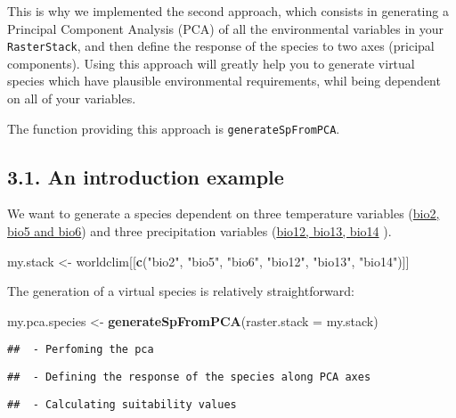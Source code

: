 \documentclass[]{article}
\newenvironment{Shaded}{\begin{snugshade}}{\end{snugshade}}
\newcommand{\KeywordTok}[1]{\textcolor[rgb]{0.13,0.29,0.53}{\textbf{#1}}}
\newcommand{\DataTypeTok}[1]{\textcolor[rgb]{0.13,0.29,0.53}{#1}}
\newcommand{\StringTok}[1]{\textcolor[rgb]{0.31,0.60,0.02}{#1}}
\newcommand{\NormalTok}[1]{#1}
\begin{document}
This is why we implemented the second approach, which consists in
generating a Principal Component Analysis (PCA) of all the environmental
variables in your \texttt{RasterStack}, and then define the response of
the species to two axes (pricipal components). Using this approach will
greatly help you to generate virtual species which have plausible
environmental requirements, whil being dependent on all of your
variables.

The function providing this approach is \texttt{generateSpFromPCA}.

\subsection{3.1. An introduction
example}\label{an-introduction-example-1}

We want to generate a species dependent on three temperature variables
(\href{http://worldclim.org/bioclim}{bio2, bio5 and bio6}) and three
precipitation variables (\href{http://worldclim.org/bioclim}{bio12,
bio13, bio14} ).

\begin{Shaded}
\begin{Highlighting}[]
\NormalTok{my.stack <-}\StringTok{ }\NormalTok{worldclim[[}\KeywordTok{c}\NormalTok{(}\StringTok{"bio2"}\NormalTok{, }\StringTok{"bio5"}\NormalTok{, }\StringTok{"bio6"}\NormalTok{, }\StringTok{"bio12"}\NormalTok{, }\StringTok{"bio13"}\NormalTok{, }\StringTok{"bio14"}\NormalTok{)]]}
\end{Highlighting}
\end{Shaded}

The generation of a virtual species is relatively straightforward:

\begin{Shaded}
\begin{Highlighting}[]
\NormalTok{my.pca.species <-}\StringTok{ }\KeywordTok{generateSpFromPCA}\NormalTok{(}\DataTypeTok{raster.stack =}\NormalTok{ my.stack)}
\end{Highlighting}
\end{Shaded}

\begin{verbatim}
##  - Perfoming the pca
\end{verbatim}

\begin{verbatim}
##  - Defining the response of the species along PCA axes
\end{verbatim}

\begin{verbatim}
##  - Calculating suitability values
\end{verbatim}
\end{document}
